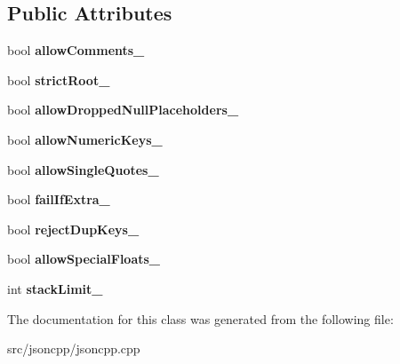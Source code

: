 \subsection*{Public Attributes}
\begin{DoxyCompactItemize}
\item 
bool {\bfseries allow\+Comments\+\_\+}\hypertarget{classJson_1_1OurFeatures_ac71bb7ba7363d3b05ed76602b036ce33}{}\label{classJson_1_1OurFeatures_ac71bb7ba7363d3b05ed76602b036ce33}

\item 
bool {\bfseries strict\+Root\+\_\+}\hypertarget{classJson_1_1OurFeatures_a2095f66a776c0a4ae6cc931a0c94242e}{}\label{classJson_1_1OurFeatures_a2095f66a776c0a4ae6cc931a0c94242e}

\item 
bool {\bfseries allow\+Dropped\+Null\+Placeholders\+\_\+}\hypertarget{classJson_1_1OurFeatures_a13963bc44bf948eec1968f7ff8e8f5f1}{}\label{classJson_1_1OurFeatures_a13963bc44bf948eec1968f7ff8e8f5f1}

\item 
bool {\bfseries allow\+Numeric\+Keys\+\_\+}\hypertarget{classJson_1_1OurFeatures_af6973fc7e774ce2d634ba99442aeb91a}{}\label{classJson_1_1OurFeatures_af6973fc7e774ce2d634ba99442aeb91a}

\item 
bool {\bfseries allow\+Single\+Quotes\+\_\+}\hypertarget{classJson_1_1OurFeatures_abbd6c196d7a22e2a360a59887eda4610}{}\label{classJson_1_1OurFeatures_abbd6c196d7a22e2a360a59887eda4610}

\item 
bool {\bfseries fail\+If\+Extra\+\_\+}\hypertarget{classJson_1_1OurFeatures_ae8ad25b90706c78f1a8fe929191ac61b}{}\label{classJson_1_1OurFeatures_ae8ad25b90706c78f1a8fe929191ac61b}

\item 
bool {\bfseries reject\+Dup\+Keys\+\_\+}\hypertarget{classJson_1_1OurFeatures_a39b8e0b86b1c24a45e800c023bb715aa}{}\label{classJson_1_1OurFeatures_a39b8e0b86b1c24a45e800c023bb715aa}

\item 
bool {\bfseries allow\+Special\+Floats\+\_\+}\hypertarget{classJson_1_1OurFeatures_af760f91cc2a7af37e44f78fb466061bb}{}\label{classJson_1_1OurFeatures_af760f91cc2a7af37e44f78fb466061bb}

\item 
int {\bfseries stack\+Limit\+\_\+}\hypertarget{classJson_1_1OurFeatures_a9a786713902d14be6d57a08cc03ccfff}{}\label{classJson_1_1OurFeatures_a9a786713902d14be6d57a08cc03ccfff}

\end{DoxyCompactItemize}


The documentation for this class was generated from the following file\+:\begin{DoxyCompactItemize}
\item 
src/jsoncpp/jsoncpp.\+cpp\end{DoxyCompactItemize}
